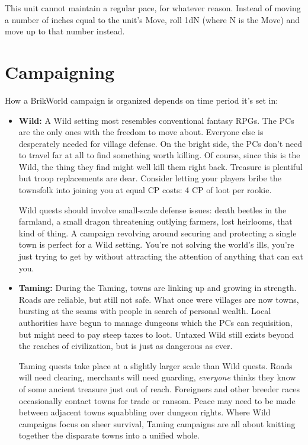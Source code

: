 \documentclass[12pt,a4paper,twocolumn]{article}
\begin{document}
This unit cannot maintain a regular pace, for whatever reason.  Instead of moving a number of inches equal to the unit's Move, roll 1dN (where N is the Move) and move up to that number instead.


\section {Campaigning }

How a BrikWorld campaign is organized depends on time period it's set in:
\begin{itemize}
\item {\bf Wild:} A Wild setting most resembles conventional fantasy RPGs.  The PCs are the only ones with the freedom to move about.  Everyone else is desperately needed for village defense.  On the bright side, the PCs don't need to travel far at all to find something worth killing.  Of course, since this is the Wild, the thing they find might well kill them right back.  Treasure is plentiful but troop replacements are dear.  Consider letting your players bribe the townsfolk into joining you at equal CP costs: 4 CP of loot per rookie.  

Wild quests should involve small-scale defense issues: death beetles in the farmland, a small dragon threatening outlying farmers, lost heirlooms, that kind of thing.  A campaign revolving around securing and protecting a single town is perfect for a Wild setting.  You're not solving the world's ills, you're just trying to get by without attracting the attention of anything that can eat you.

\item {\bf Taming:} During the Taming, towns are linking up and growing in strength.  Roads are reliable, but still not safe.  What once were villages are now towns, bursting at the seams with people in search of personal wealth.  Local authorities have begun to manage dungeons which the PCs can requisition, but might need to pay steep taxes to loot. Untaxed Wild still exists beyond the reaches of civilization, but is just as dangerous as ever.  

Taming quests take place at a slightly larger scale than Wild quests.  Roads will need clearing, merchants will need guarding, {\it everyone} thinks they know of some ancient treasure just out of reach.  Foreigners and other breeder races occasionally contact towns for trade or ransom.  Peace may need to be made between adjacent towns squabbling over dungeon rights.  Where Wild campaigns focus on sheer survival, Taming campaigns are all about knitting together the disparate towns into a unified whole.


\end{itemize}
\end{document}
